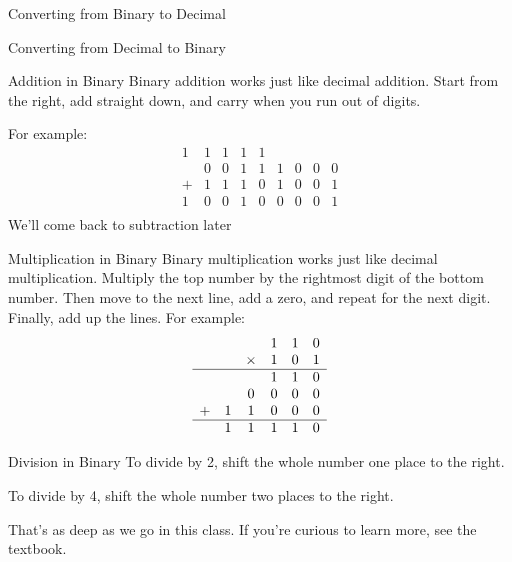 \begin{frame}{Converting from Binary to Decimal}
\end{frame}

\begin{frame}{Converting from Decimal to Binary}
\end{frame}

\begin{frame}{Addition in Binary}
Binary addition works just like decimal addition. 
Start from the right, add straight down, and carry when you run out of digits.

For example:
\[
\begin{array}{ccccccccc}
    1 & 1 & 1 & 1 & 1 &   &   &   &   \\ 
      & 0 & 0 & 1 & 1 & 1 & 0 & 0 & 0 \\ 
    + & 1 & 1 & 1 & 0 & 1 & 0 & 0 & 1 \\
    \hline
    1 & 0 & 0 & 1 & 0 & 0 & 0 & 0 & 1 \\ 
\end{array}
\]
We'll come back to subtraction later
\end{frame}

\begin{frame}{Multiplication in Binary}
Binary multiplication works just like decimal multiplication. 
Multiply the top number by the rightmost digit of the bottom number.
Then move to the next line, add a zero, and repeat for the next digit.
Finally, add up the lines. For example:
\[
\begin{array}{cccccc}
        &   &        & 1 & 1 & 0 \\ 
        &   & \times & 1 & 0 & 1 \\
    \hline
        &   &        & 1 & 1 & 0 \\ 
        &   & 0      & 0 & 0 & 0 \\
        + & 1 & 1      & 0 & 0 & 0 \\
        \hline 
        & 1 & 1      & 1 & 1 & 0 \\
\end{array}
\]
\end{frame}


\begin{frame}{Division in Binary}
To divide by 2, shift the whole number one place to the right.

To divide by 4, shift the whole number two places to the right. 

That's as deep as we go in this class. If you're curious to learn more, see the textbook.

\end{frame}

